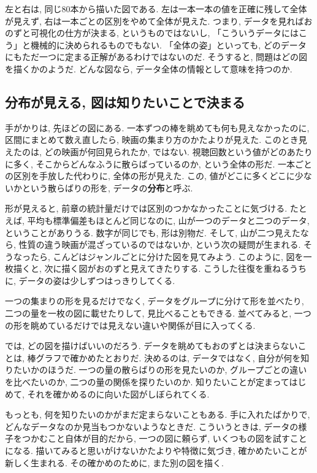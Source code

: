     左と右は, 同じ80本から描いた図である.
    左は一本一本の値を正確に残して全体が見えず, 右は一本ごとの区別をやめて全体が見えた.
    つまり, データを見ればおのずと可視化の仕方が決まる, というものではないし, 「こういうデータにはこう」と機械的に決められるものでもない.
    「全体の姿」といっても, どのデータにもただ一つに定まる正解があるわけではないのだ.
    そうすると, 問題はどの図を描くかのようだ.
    どんな図なら, データ全体の情報として意味を持つのか.

  \subsection{分布が見える, 図は知りたいことで決まる}

    手がかりは, 先ほどの図にある.
    一本ずつの棒を眺めても何も見えなかったのに, 区間にまとめて数え直したら, 映画の集まり方のかたよりが見えた.
    このとき見えたのは, どの映画が何回見られたか, ではない.
    視聴回数という値がどのあたりに多く, そこからどんなふうに散らばっているのか, という全体の形だ.
    一本ごとの区別を手放した代わりに, 全体の形が見えた.
    この, 値がどこに多くどこに少ないかという散らばりの形を, データの\textbf{分布}と呼ぶ.

    形が見えると, 前章の統計量だけでは区別のつかなかったことに気づける.
    たとえば, 平均も標準偏差もほとんど同じなのに, 山が一つのデータと二つのデータ, ということがありうる.
    数字が同じでも, 形は別物だ.
    そして, 山が二つ見えたなら, 性質の違う映画が混ざっているのではないか, という次の疑問が生まれる.
    そうなったら, こんどはジャンルごとに分けた図を見てみよう.
    このように, 図を一枚描くと, 次に描く図がおのずと見えてきたりする.
    こうした往復を重ねるうちに, データの姿は少しずつはっきりしてくる.

    一つの集まりの形を見るだけでなく, データをグループに分けて形を並べたり, 二つの量を一枚の図に載せたりして, 見比べることもできる.
    並べてみると, 一つの形を眺めているだけでは見えない違いや関係が目に入ってくる.

    では, どの図を描けばいいのだろう.
    データを眺めてもおのずとは決まらないことは, 棒グラフで確かめたとおりだ.
    決めるのは, データではなく, 自分が何を知りたいかのほうだ.
    一つの量の散らばりの形を見たいのか, グループごとの違いを比べたいのか, 二つの量の関係を探りたいのか.
    知りたいことが定まってはじめて, それを確かめるのに向いた図がしぼられてくる.

    もっとも, 何を知りたいのかがまだ定まらないこともある.
    手に入れたばかりで, どんなデータなのか見当もつかないようなときだ.
    こういうときは, データの様子をつかむこと自体が目的だから, 一つの図に頼らず, いくつもの図を試すことになる.
    描いてみると思いがけないかたよりや特徴に気づき, 確かめたいことが新しく生まれる.
    その確かめのために, また別の図を描く.

